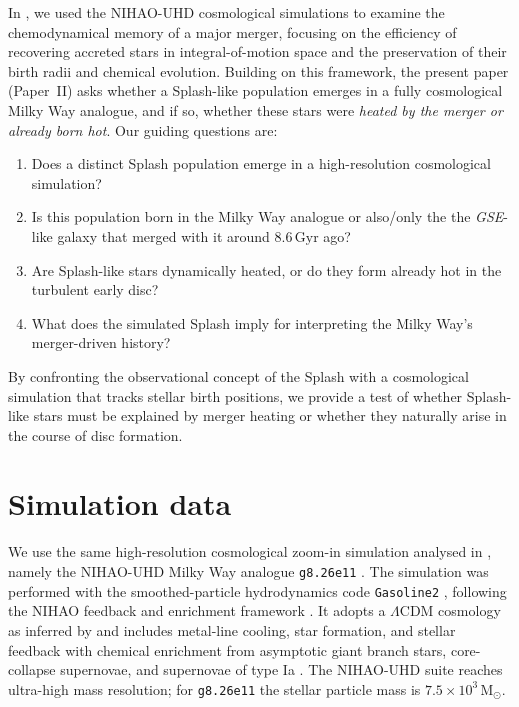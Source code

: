 \documentclass[fleqn,usenatbib]{mnras}
\begin{document}
In \citet[][hereafter Paper~I]{Buder2025c}, we used the NIHAO-UHD cosmological simulations \citep{Buck2020, Buck2021} to examine the chemodynamical memory of a major merger, focusing on the efficiency of recovering accreted stars in integral-of-motion space and the preservation of their birth radii and chemical evolution. Building on this framework, the present paper (Paper~II) asks whether a Splash-like population emerges in a fully cosmological Milky Way analogue, and if so, whether these stars were \emph{heated by the merger or already born hot}. Our guiding questions are:
\begin{enumerate}[leftmargin=2em,labelwidth=0em]
    \item Does a distinct Splash population emerge in a high-resolution cosmological simulation?
    \item Is this population born in the Milky Way analogue or also/only the the \textit{GSE}-like galaxy that merged with it around $8.6\,\mathrm{Gyr}$ ago?
    \item Are Splash-like stars dynamically heated, or do they form already hot in the turbulent early disc?
    \item What does the simulated Splash imply for interpreting the Milky Way’s merger-driven history?
\end{enumerate}

By confronting the observational concept of the Splash with a cosmological simulation that tracks stellar birth positions, we provide a test of whether Splash-like stars must be explained by merger heating or whether they naturally arise in the course of disc formation.

\section{Simulation data}
\label{sec:data}

We use the same high-resolution cosmological zoom-in simulation analysed in , namely the NIHAO-UHD Milky Way analogue \texttt{g8.26e11} \citep{Wang2015, Buck2019b, Buck2020b, Buck2021}. The simulation was performed with the smoothed-particle hydrodynamics code \texttt{Gasoline2} \citep{Wadsley2017}, following the NIHAO feedback and enrichment framework \citep{Stinson2006, Stinson2013, Wang2015}. It adopts a $\Lambda$CDM cosmology as inferred by \citet{Planck2014} and includes metal-line cooling, star formation, and stellar feedback with chemical enrichment from asymptotic giant branch stars, core-collapse supernovae, and supernovae of type Ia \citep{Buck2021}. The NIHAO-UHD suite reaches ultra-high mass resolution; for \texttt{g8.26e11} the stellar particle mass is $7.5 \times 10^3\,\mathrm{M_{\odot}}$.
\end{document}

